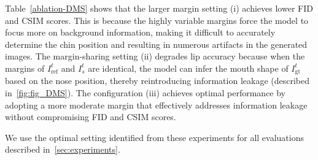 Table~\ref{ablation-DMS} shows that the larger margin setting (i) achieves lower FID and CSIM scores. 
This is because the highly variable margins force the model to focus more on background information, making it difficult to accurately determine the chin position and resulting in numerous artifacts in the generated images. 
The margin-sharing setting (ii) degrades lip accuracy because when the margins of \(I_{\text{ref}}^{t}\) and \(I_{s}^{t}\) are identical, the model can infer the mouth shape of \(I_{\text{gt}}^{t}\) based on the nose position, thereby reintroducing information leakage (described in~\cref{fig:fig_DMS}). 
The configuration (iii) achieves optimal performance by adopting a more moderate margin that effectively addresses information leakage without compromising FID and CSIM scores.

We use the optimal setting identified from these experiments for all evaluations described in~\cref{sec:experiments}.



